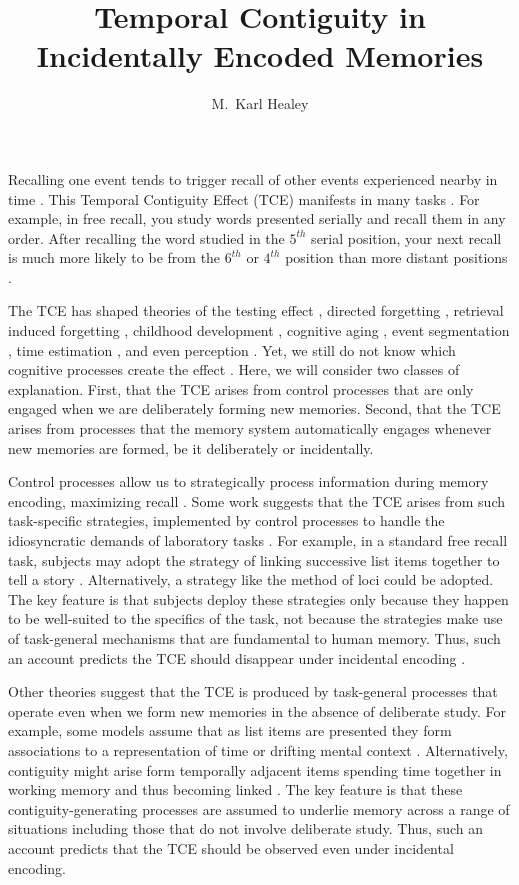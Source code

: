 \documentclass[man,natbib,floatsintext]{apa6} %
\title{Temporal Contiguity in Incidentally Encoded Memories}
\author{M.\ Karl Healey}
\affiliation{Michigan State University}
\begin{document}
\maketitle
Recalling one event tends to trigger recall of other events experienced nearby in time \citep{HealKaha17}. This Temporal Contiguity Effect (TCE) manifests in many tasks \citep{DaviEtal08,SchwEtal05}. For example, in free recall, you study words presented serially and recall them in any order. After recalling the word studied in the $5^{th}$ serial position, your next recall is much more likely to be from the $6^{th}$ or $4^{th}$ position than more distant positions \citep{Kaha96}. \label{TODO-1}

The TCE has shaped theories of the testing effect \citep{KarpEtal14}, directed forgetting \citep{SahaEtal13}, retrieval induced forgetting \citep{KlieBaum16}, childhood development \citep{JarroEtal15}, cognitive aging \citep{WahlHuff15,HealKaha15}, event segmentation \citep{EzzyDava14}, time estimation \citep{SahaSmit13}, and even perception \citep{TurkEtal12}. Yet, we still do not know which cognitive processes create the effect \citep{HealKaha17}. Here, we will consider two classes of explanation. First, that the TCE arises from control processes that are only engaged when we are deliberately forming new memories. Second, that the TCE arises from processes that the memory system automatically engages whenever new memories are formed, be it deliberately or incidentally. \label{TODO-2}   

Control processes \citep{LehmMalm13,AtkiShif68} allow us to strategically process information during memory encoding, maximizing recall \citep[e.g.,][]{Unsw16,DelaKnow05}. Some work suggests that the TCE arises from such task-specific strategies, implemented by control processes to handle the idiosyncratic demands of laboratory tasks \citep{Hint16}. For example, in a standard free recall task, subjects may adopt the strategy of linking successive list items together to tell a story \citep{DelaKnow05}. Alternatively, a strategy like the method of loci could be adopted. The key feature is that subjects deploy these strategies only because they happen to be well-suited to the specifics of the task, not because the strategies make use of task-general mechanisms that are fundamental to human memory. Thus, such an account predicts the TCE should disappear under incidental encoding \citep{Hint16}.

Other theories suggest that the TCE is produced by task-general processes that operate even when we form new memories in the absence of deliberate study. For example, some models assume that as list items are presented they form associations to a representation of time \citep{HowaEtal14a,BrowEtal07} or drifting mental context \citep{LohnEtal14}. Alternatively, contiguity might arise form temporally adjacent items spending time together in working memory and thus becoming linked \citep{LehmMalm13}. The key feature is that these contiguity-generating processes are assumed to underlie memory across a range of situations including those that do not involve deliberate study. Thus, such an account  predicts that the TCE should be observed even under incidental encoding.
\end{document}
